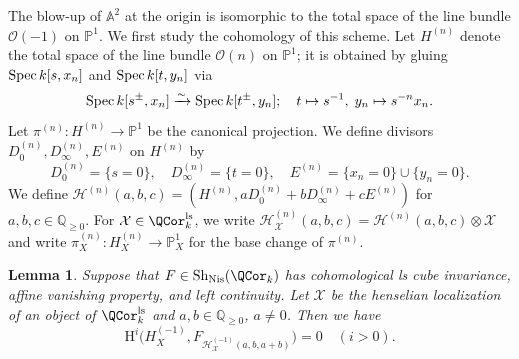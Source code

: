 \documentclass{amsart}
\theoremstyle{plain}
\newtheorem{lemma}[theorem]{Lemma}
\theoremstyle{definition}
\theoremstyle{remark}
\numberwithin{equation}{section}
\DeclareMathOperator{\Sh}{Sh}
\def\Nis{\mathrm{Nis}}
\def\ls{\mathrm{ls}}
\begin{document}
The blow-up of $\mathbb{A}^2$ at the origin is isomorphic to the total space of the line bundle $\mathcal{O}(-1)$ on $\mathbb{P}^1$.
We first study the cohomology of this scheme.
Let $H^{(n)}$ denote the total space of the line bundle $\mathcal{O}(n)$ on $\mathbb{P}^1$;
it is obtained by gluing $\operatorname{Spec} k[s,x_n]$ and $\operatorname{Spec} k[t,y_n]$ via
$$
	\operatorname{Spec} k[s^\pm,x_n]\xrightarrow{\sim}\operatorname{Spec} k[t^\pm,y_n];\quad t\mapsto s^{-1},\;y_n\mapsto s^{-n}x_n.
$$
Let $\pi^{(n)}\colon H^{(n)}\to \mathbb{P}^1$ be the canonical projection.
We define divisors $D_0^{(n)}, D_\infty^{(n)}, E^{(n)}$ on $H^{(n)}$ by
$$
	D_0^{(n)} = \{s=0\},\quad D_\infty^{(n)} = \{t=0\}, \quad E^{(n)} = \{x_n=0\}\cup \{y_n=0\}.
$$
We define $\mathcal{H}^{(n)}(a,b,c)=(H^{(n)}, a D_0^{(n)}+b D_\infty^{(n)}+c E^{(n)})$ for $a,b,c\in \mathbb{Q}_{\geq 0}$.
For $\mathcal{X}\in \QCor_k^\ls$, we write $\mathcal{H}^{(n)}_\mathcal{X}(a,b,c) = \mathcal{H}^{(n)}(a,b,c)\otimes \mathcal{X}$ and write $\pi^{(n)}_X\colon H^{(n)}_X\to \mathbb{P}^1_X$ for the base change of $\pi^{(n)}$.

\begin{lemma}\label{Hirzebruch_vanishing}
	Suppose that $F\in \Sh_\Nis(\QCor_k)$ has cohomological ls cube invariance, affine vanishing property, and left continuity.
	Let $\mathcal{X}$ be the henselian localization of an object of $\QCor_k^\ls$ and $a,b\in \mathbb{Q}_{\geq 0}$, $a\neq 0$.
	Then we have
    $$
		\mathrm{H}^i\bigl(H^{(-1)}_X, F_{\mathcal{H}^{(-1)}_\mathcal{X}(a,b,a+b)}\bigr)=0\quad (i>0).
	$$
\end{lemma}
\end{document}
